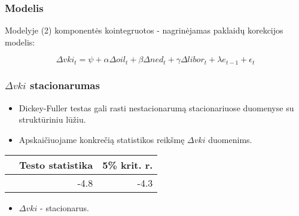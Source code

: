 \documentclass[utf8x,hyperref={unicode}]{beamer}
\begin{document}
\begin{frame}
\frametitle{Modelis}\indent

\indent Modelyje (2) komponentės kointegruotos - nagrinėjamas paklaidų korekcijos modelis:

\begin{equation}
\Delta\textit{vki}_t = \psi + \alpha\Delta\textit{oil}_t + \beta\Delta\textit{ned}_t + \gamma\Delta\textit{libor}_t + \lambda\textit{e}_{t-1} + \epsilon_t
\end{equation}

\end{frame}

\begin{frame}
\frametitle{$\Delta\textit{vki}$ stacionarumas}

\begin{itemize}
\item Dickey-Fuller testas gali rasti nestacionarumą stacionariuose duomenyse su struktūriniu lūžiu.
\item Apskaičiuojame konkrečią statistikos reikšmę $\Delta\textit{vki}$ duomenims.
\end{itemize}

\begin{table}[!h]
\begin{center}
\begin{tabular}{rrr}
  \hline
 & Testo statistika & 5\% krit. r. \\ 
  \hline
 & -4.8 & -4.3 \\ 
   \hline
\end{tabular}
\end{center}
\end{table}

\begin{itemize}
\item $\Delta\textit{vki}$ - stacionarus.
\end{itemize}

\end{frame}
\end{document}
